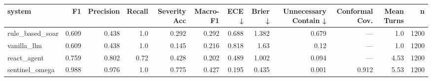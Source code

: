 \begin{tabular}{lrrrrrrrrrrr}
\toprule
system & F1 & Precision & Recall & Severity Acc & Macro-F1 & ECE ↓ & Brier ↓ & Unnecessary Contain ↓ & Conformal Cov. & Mean Turns & n \\
\midrule
rule_based_soar & 0.609 & 0.438 & 1.0 & 0.292 & 0.292 & 0.688 & 1.382 & 0.679 & — & 1.0 & 1200 \\
vanilla_llm & 0.609 & 0.438 & 1.0 & 0.145 & 0.216 & 0.818 & 1.63 & 0.12 & — & 1.0 & 1200 \\
react_agent & 0.759 & 0.802 & 0.72 & 0.428 & 0.202 & 0.489 & 1.002 & 0.094 & — & 4.53 & 1200 \\
sentinel_omega & 0.988 & 0.976 & 1.0 & 0.775 & 0.427 & 0.195 & 0.435 & 0.001 & 0.912 & 5.53 & 1200 \\
\bottomrule
\end{tabular}
